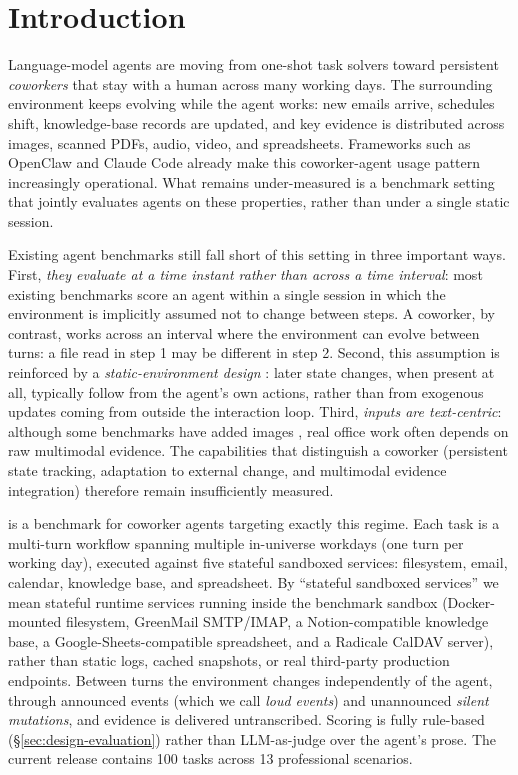 
\section{Introduction}
\label{sec:intro}

Language-model agents are moving from one-shot task solvers toward persistent \emph{coworkers} that stay with a human across many working days. The surrounding environment keeps evolving while the agent works: new emails arrive, schedules shift, knowledge-base records are updated, and key evidence is distributed across images, scanned PDFs, audio, video, and spreadsheets. Frameworks such as OpenClaw and Claude Code already make this coworker-agent usage pattern increasingly operational. What remains under-measured is a benchmark setting that jointly evaluates agents on these properties, rather than under a single static session.

Existing agent benchmarks still fall short of this setting in three important ways. First, \emph{they evaluate at a time instant rather than across a time interval}: most existing benchmarks score an agent within a single session in which the environment is implicitly assumed not to change between steps. A coworker, by contrast, works across an interval where the environment can evolve between turns: a file read in step 1 may be different in step 2. Second, this assumption is reinforced by a \emph{static-environment design} \cite{yao2024tau,drouin2024workarena,xu2024theagentcompany}: later state changes, when present at all, typically follow from the agent's own actions, rather than from exogenous updates coming from outside the interaction loop. Third, \emph{inputs are text-centric}: although some benchmarks have added images \cite{koh2024visualwebarena,xie2024osworld}, real office work often depends on raw multimodal evidence. The capabilities that distinguish a coworker (persistent state tracking, adaptation to external change, and multimodal evidence integration) therefore remain insufficiently measured.

\bench{} is a benchmark for coworker agents targeting exactly this regime. Each task is a multi-turn workflow spanning multiple in-universe workdays (one turn per working day), executed against five stateful sandboxed services: filesystem, email, calendar, knowledge base, and spreadsheet. By ``stateful sandboxed services'' we mean stateful runtime services running inside the benchmark sandbox (Docker-mounted filesystem, GreenMail SMTP/IMAP, a Notion-compatible knowledge base, a Google-Sheets-compatible spreadsheet, and a Radicale CalDAV server), rather than static logs, cached snapshots, or real third-party production endpoints. Between turns the environment changes independently of the agent, through announced events (which we call \emph{loud events}) and unannounced \emph{silent mutations}, and evidence is delivered untranscribed. Scoring is fully rule-based (\S\ref{sec:design-evaluation}) rather than LLM-as-judge over the agent's prose. The current release contains 100 tasks across 13 professional scenarios.

